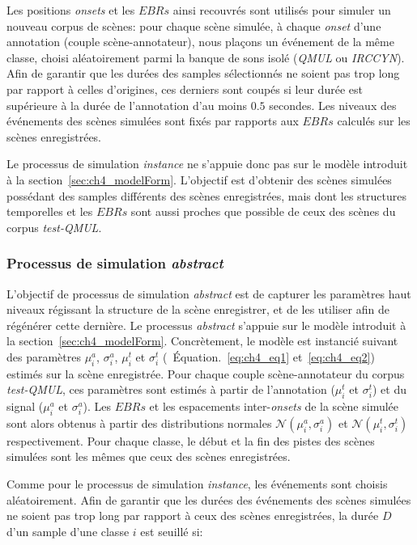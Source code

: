 Les positions \emph{onsets} et les $EBRs$ ainsi recouvrés sont utilisés pour simuler un nouveau corpus de scènes: pour chaque scène simulée, à chaque \emph{onset} d'une annotation (couple scène-annotateur), nous plaçons un événement de la même classe, choisi aléatoirement parmi la banque de sons isolé (\emph{QMUL} ou \emph{IRCCYN}). Afin de garantir que les durées des samples sélectionnés ne soient pas trop long par rapport à celles d'origines, ces derniers sont coupés si leur durée est  supérieure à la durée de l'annotation d'au moins $0.5$ secondes.  Les niveaux des événements des scènes simulées sont fixés par rapports aux $EBRs$ calculés sur les scènes enregistrées. 

Le processus de simulation \emph{instance} ne s'appuie donc pas sur le modèle introduit à la section~\ref{sec:ch4_modelForm}.   L'objectif est d’obtenir des scènes simulées possédant des samples différents des scènes enregistrées, mais dont les structures temporelles et les $EBRs$ sont aussi proches que possible de ceux des scènes du corpus \emph{test-QMUL}.

\subsubsection{Processus de simulation \emph{abstract}}
\label{sec:ch7_simuProcessAbstract}

L'objectif de processus de simulation \emph{abstract} est de capturer les paramètres haut niveaux régissant la structure de la scène enregistrer, et de les utiliser afin de régénérer cette dernière. Le processus \emph{abstract} s'appuie sur le modèle introduit à la section~\ref{sec:ch4_modelForm}. Concrètement, le modèle est instancié suivant des paramètres $\mu_i^a$, $\sigma_i^a$, $\mu_i^t$ et $\sigma_i^t$ (\cf~Équation.~\ref{eq:ch4_eq1} et~\ref{eq:ch4_eq2}) estimés sur la scène enregistrée. Pour chaque couple scène-annotateur du corpus  \emph{test-QMUL}, ces paramètres sont estimés à partir de l'annotation ($\mu_i^t$ et $\sigma_i^t$) et du signal ($\mu_i^a$ et $\sigma_i^a$). Les $EBRs$ et les espacements inter-\emph{onsets} de la scène simulée sont alors obtenus  à partir des distributions normales $\mathcal{N}(\mu_i^a,\sigma_i^a)$ et $\mathcal{N}(\mu_i^t,\sigma_i^t)$ respectivement. Pour chaque classe, le début et la fin des pistes des scènes simulées sont les mêmes que ceux des scènes enregistrées.

Comme pour le processus de simulation \emph{instance}, les événements sont choisis aléatoirement. Afin de garantir que les durées des événements des scènes simulées ne soient pas trop long par rapport à ceux des scènes enregistrées, la durée $D$ d'un sample d'une classe $i$ est seuillé si:

